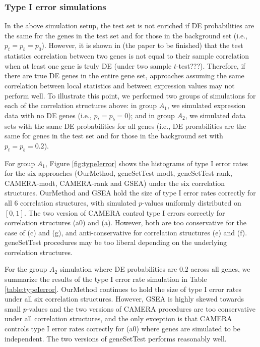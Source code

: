 \documentclass[11pt, a4paper]{article}
\begin{document}
		
		\subsubsection{Type I error simulations}
		  
		   In the above simulation setup, the test set is not enriched if DE probabilities are the same for the genes in the test set and for those in the background set (i.e., $p_t = p_b = p_0$). However, it is shown in (the paper to be finished) that the test statistics correlation between two genes is not equal to their sample correlation when at least one gene is truly DE (under two sample $t$-test???). Therefore, if there are true DE genes in the entire gene set, approaches assuming the same correlation between local statistics and between expression values may not perform well. To illustrate this point, we performed two groups of simulations for each of the correlation structures above: in group $A_1$, we simulated expression data with no DE genes (i.e., $p_t = p_b = 0$); and in group $A_2$, we simulated data sets with the same DE probabilities for all genes (i.e., DE prorabilities are the same for genes in the test set and for those in the background set with  $p_t= p_b = 0.2$). 
		 
		  For group $A_1$, Figure \ref{fig:typeIerror} shows the histograms of type I error rates for the six approaches (OurMethod, geneSetTest-modt, geneSetTest-rank, CAMERA-modt, CAMERA-rank and GSEA) under the six correlation structures. OurMethod and GSEA hold the size of type I error rates correctly for all 6 correlation structures, with simulated $p$-values uniformly distributed on $[0, 1]$. The two version of CAMERA control type I errors correctly for correlation structures (a0) and (a). However, both are too conservative for the case of (c) and (g), and anti-conservative for correlation structures (e) and (f). geneSetTest procedures may be too liberal depending on the underlying correlation structures. 
		  
		 For the group $A_2$ simulation where DE probabilities are 0.2 across all genes, we summarize the results of the type I error rate simulation in Table \ref{table:typeIerror}. OurMethod continues to hold the size of type I error rates under all six correlation structures. However, GSEA is highly skewed towards small $p$-values and the two versions of CAMERA procedures are too conservative under all correlation structures, and the only exception is that CAMERA controls type I error rates correctly for (a0) where genes are simulated to be independent. The two versions of geneSetTest performs reasonably well.
		 
\end{document}
